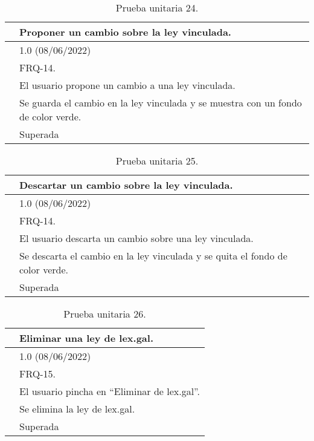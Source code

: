 \begin{table}[H]
\begin{center}
\begin{tabular}{|p{3cm}|p{10cm}|} \hline
\centering {\bf PU-24} & Proponer un cambio sobre la ley vinculada.  \\ \hline\hline
\centering {\bf Versión} & 1.0 (08/06/2022) \\ \hline
\centering {\bf Dependencias} & FRQ-14. \\ \hline
\centering {\bf Descripción} &  El usuario propone un cambio a una ley vinculada. \\ \hline
\centering {\bf Criterio de aceptación} & Se guarda el cambio en la ley vinculada y se muestra con un fondo de color verde. \\ \hline
\centering {\bf Estado} & Superada \\ \hline
\end{tabular}
\caption{Prueba unitaria 24.}
\label{enlacePU24}
\end{center}
\end{table}

\begin{table}[H]
\begin{center}
\begin{tabular}{|p{3cm}|p{10cm}|} \hline
\centering {\bf PU-25} & Descartar un cambio sobre la ley vinculada.  \\ \hline\hline
\centering {\bf Versión} & 1.0 (08/06/2022) \\ \hline
\centering {\bf Dependencias} & FRQ-14. \\ \hline
\centering {\bf Descripción} &  El usuario descarta un cambio sobre una ley vinculada. \\ \hline
\centering {\bf Criterio de aceptación} & Se descarta el cambio en la ley vinculada y se quita el fondo de color verde. \\ \hline
\centering {\bf Estado} & Superada \\ \hline
\end{tabular}
\caption{Prueba unitaria 25.}
\label{enlacePU25}
\end{center}
\end{table}

\begin{table}[H]
\begin{center}
\begin{tabular}{|p{3cm}|p{10cm}|} \hline
\centering {\bf PU-26} & Eliminar una ley de lex.gal.  \\ \hline\hline
\centering {\bf Versión} & 1.0 (08/06/2022) \\ \hline
\centering {\bf Dependencias} & FRQ-15. \\ \hline
\centering {\bf Descripción} &  El usuario pincha en ``Eliminar de lex.gal''. \\ \hline
\centering {\bf Criterio de aceptación} & Se elimina la ley de lex.gal. \\ \hline
\centering {\bf Estado} & Superada \\ \hline
\end{tabular}
\caption{Prueba unitaria 26.}
\label{enlacePU26}
\end{center}
\end{table}

